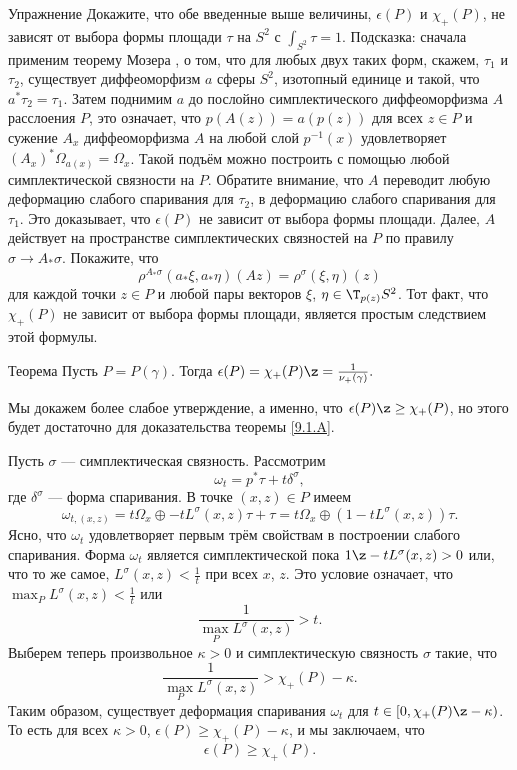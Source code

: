 \begin{thm*}{Упражнение}
Докажите, что обе введенные выше величины, $\epsilon(P)$ и $\chi_+ (P)$, не зависят от выбора формы площади $\tau$ на $S^2$ с $\int_{S^2} \tau = 1$.
Подсказка: сначала применим теорему Мозера \cite{MS}, о том, что для любых двух таких форм, скажем, $\tau_1$ и $\tau_2$, существует диффеоморфизм $a$ сферы $S^2$, изотопный единице и такой, что $a^\ast \tau_2 = \tau_1$.
Затем поднимим $a$ до послойно симплектического диффеоморфизма $A$ расслоения $P$, это означает, что $p(A(z)) = a(p(z))$ для всех $z \in P$ и сужение $A_x$ диффеоморфизма $A$ на любой слой $p^{-1} (x)$ удовлетворяет $(A_x)^\ast \Omega_{a(x)} = \Omega_x$.
Такой подъём можно построить с помощью любой симплектической связности на $P$.
Обратите внимание, что $A$ переводит любую деформацию слабого спаривания для $\tau_2$, в деформацию слабого спаривания для $\tau_1$.
Это доказывает, что $\epsilon(P)$ не зависит от выбора формы площади.
Далее, $A$ действует на пространстве симплектических связностей на $P$ по правилу $\sigma \to A_\ast \sigma$.
Покажите, что 
\[\rho^{A_\ast \sigma} (a_\ast \xi, a_\ast \eta)(Az) = \rho^\sigma (\xi, \eta)(z)\]
для каждой точки $z \in P$ и любой пары векторов $\xi$, $\eta \in \T_{p(z)} S^2$.
Тот факт, что $\chi_+(P)$ не зависит от выбора формы площади, является простым следствием этой формулы.
\end{thm*}

\begin{thm}[(\cite{P4})]{Теорема}\label{9.3.B}
Пусть $P = P(\gamma)$.
Тогда $\epsilon(P) = \chi_+ (P) \z= \frac1{\nu_+(\gamma)}.$
\end{thm}

Мы докажем более слабое утверждение, а именно, что $\epsilon(P) \z\ge \chi_+ (P)$, но этого будет достаточно для доказательства теоремы \ref{9.1.A}.

Пусть $\sigma$ --- симплектическая связность.
Рассмотрим 
\[\omega_t = p^\ast \tau + t\delta^\sigma,\]
где $\delta^\sigma$ --- форма спаривания.
В точке $(x, z) \in P$ имеем 
\[\omega_{t,(x,z)} = t\Omega_x \oplus -tL^\sigma (x, z)\tau + \tau = t\Omega_x \oplus (1 - tL^\sigma (x, z))\tau.\]
Ясно, что $\omega_t$ удовлетворяет первым трём свойствам в построении слабого спаривания.
Форма $\omega_t$ является симплектической пока $1 \z- tL^\sigma (x, z) > 0$ или, что то же самое, $L^\sigma (x, z) < \frac1t$ при всех $x$, $z$.
Это условие означает, что 
$\max_P L^\sigma (x, z) < \frac1t$
или 
\[\frac1{\max_P L^\sigma (x, z)} > t.\]
Выберем теперь произвольное $\kappa > 0$ и симплектическую связность $\sigma$ такие, что 
\[\frac{1}{\max_P L^\sigma(x, z)} > \chi_+ (P) - \kappa.\]
Таким образом, существует деформация спаривания $\omega_t$ для $t \in [0, \chi_+ (P) \z- \kappa)$.
То есть для всех $\kappa > 0$, $\epsilon(P) \ge \chi_+ (P) - \kappa$, и мы заключаем, что 
\[\epsilon(P) \ge \chi_+ (P).\]

